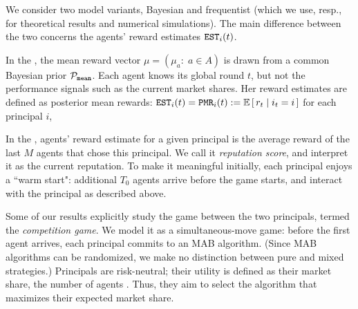 

We consider two model variants, Bayesian and frequentist (which we use, resp., for theoretical results and numerical simulations). The main difference between the two concerns the agents' reward estimates $\mathtt{EST}_i(t)$.

\begin{OneLiners}
\item In the \emph{\TheoryModel}, the mean reward vector $\mu = (\mu_a:\; a\in A)$ is drawn from a common Bayesian prior $\mathcal{P}_\mathtt{mean}$. Each agent knows its global round $t$, but not the performance signals such as the current market shares. Her reward estimates are defined as posterior mean rewards:
        $\est_i(t) = \PMR_i(t) := \E\sbr{ r_t\mid i_t = i}$
    for each principal $i$, 


\item In the \emph{\ExptsModel}, agents' reward estimate for a given principal is the average reward of the last $M$ agents that chose this principal. We call it \emph{reputation score}, and interpret it as the current reputation. To make it meaningful initially, each principal enjoys a ``warm start": additional $T_0$ agents arrive before the game starts, and interact with the principal as described above.

\end{OneLiners}

Some of our results explicitly study the game between the two principals, termed the \emph{competition game}. We model it as a simultaneous-move game: before the first agent arrives, each principal commits to an MAB algorithm. (Since MAB algorithms can be randomized, we make no distinction between pure and mixed strategies.) Principals are risk-neutral; their utility is defined as their market share, \ie the number of agents . Thus, they aim to select the algorithm that maximizes their expected market share.

